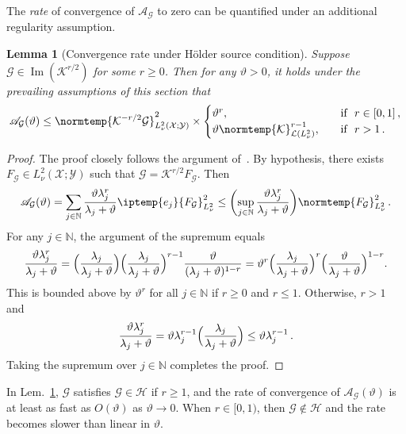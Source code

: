 \documentclass{article}
\theoremstyle{plain}
\newtheorem{lemma}[theorem]{Lemma}
\theoremstyle{my_def}
\theoremstyle{my_rem}
\numberwithin{equation}{section}
\numberwithin{theorem}{section}%
\newcommand{\N}{\mathbb{N}}
\newcommand{\scrA}{\mathscr{A}}
\newcommand{\cG}{\mathcal{G}}
\newcommand{\cH}{\mathcal{H}}
\newcommand{\cK}{\mathcal{K}}
\newcommand{\cL}{\mathcal{L}}
\newcommand{\cX}{\mathcal{X}}
\newcommand{\cY}{\mathcal{Y}}
\newcommand{\ip}{\iptemp}
\newcommand{\norm}{\normtemp}
\DeclareMathOperator{\image}{Im} %
\begin{document}
The \emph{rate} of convergence of $\scrA_\cG$ to zero can be quantified under an additional regularity assumption.
\begin{lemma}[Convergence rate under H\"older source condition]\label{lem:rkhs_approx_rate}
    Suppose $\cG\in\image(\cK^{r/2})$ for some $r\geq 0$. Then for any $\vartheta>0$, it holds under the prevailing assumptions of this section that
    \begin{equation}
    \scrA_\cG(\vartheta)
    \leq 
    \norm{\cK^{-r/2}\cG}^2_{L^2_{\nu}(\cX;\cY)}\times
    \begin{cases}
        \vartheta^{r},\quad &\text{if }\ r\in[0,1]\,,\\
        \vartheta\norm{\cK}_{\cL(L^2_\nu)}^{r-1},\quad &\text{if }\ r>1\,.
    \end{cases}
    \end{equation}
\end{lemma}
\begin{proof}
    The proof closely follows the argument of~\citet[Thm. 4, p. 295]{smale2005shannon}. By hypothesis, there exists $F_{\cG}\in L^2_\nu(\cX;\cY)$ such that $\cG = \cK^{r/2}F_\cG$. Then
    \begin{equation*}
     \scrA_\cG(\vartheta) = \sum_{j\in\N}\frac{\vartheta\lambda_j^r}{\lambda_j + \vartheta} \ip{e_j}{F_\cG}_{L^2_\nu}^2
     \leq
     \biggl(\sup_{j\in\N} \frac{\vartheta\lambda_j^r}{\lambda_j + \vartheta}\biggr)\norm{F_\cG}_{L^2_\nu}^2\,.
    \end{equation*}
    For any $j\in\N$, the argument of the supremum equals
    \begin{equation*}
    \frac{\vartheta\lambda_j^r}{\lambda_j + \vartheta}=\Bigl(\frac{\lambda_j}{\lambda_j + \vartheta}\Bigr)\Bigl(\frac{\lambda_j}{\lambda_j + \vartheta}\Bigr)^{r-1}
    \frac{\vartheta}{(\lambda_j + \vartheta)^{1-r}}= \vartheta^r \Bigl(\frac{\lambda_j}{\lambda_j + \vartheta}\Bigr)^r\Bigl(\frac{\vartheta}{\lambda_j + \vartheta}\Bigr)^{1-r}.
    \end{equation*}
    This is bounded above by $\vartheta^r$ for all $j\in\N$ if $r\geq0$ and $r\leq 1$. Otherwise, $r>1$ and
    \begin{equation*}
        \frac{\vartheta\lambda_j^r}{\lambda_j + \vartheta}=\vartheta \lambda_j^{r-1}\Bigl(\frac{\lambda_j}{\lambda_j + \vartheta}\Bigr)\leq \vartheta \lambda_j^{r-1}\,.
    \end{equation*}
    Taking the supremum over $j\in\N$ completes the proof.
\end{proof}
In Lem.~\ref{lem:rkhs_approx_rate}, $\cG$ satisfies $\cG\in\cH$ if $r\geq 1$, and the rate of convergence of $\scrA_\cG(\vartheta)$ is at least as fast as $O(\vartheta)$ as $\vartheta\to 0$. When $r\in[0,1)$, then $\cG\notin\cH$ and the rate becomes slower than linear in $\vartheta$.
\end{document}
